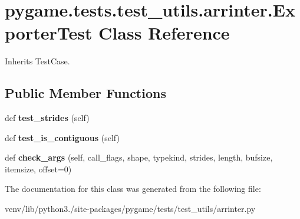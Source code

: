\hypertarget{classpygame_1_1tests_1_1test__utils_1_1arrinter_1_1_exporter_test}{}\section{pygame.\+tests.\+test\+\_\+utils.\+arrinter.\+Exporter\+Test Class Reference}
\label{classpygame_1_1tests_1_1test__utils_1_1arrinter_1_1_exporter_test}


Inherits Test\+Case.

\subsection*{Public Member Functions}
\begin{DoxyCompactItemize}
\item 
\mbox{\label{classpygame_1_1tests_1_1test__utils_1_1arrinter_1_1_exporter_test_a2ac60a9afe2a81929ff4c0376035f730}} 
def {\bfseries test\+\_\+strides} (self)
\item 
\mbox{\label{classpygame_1_1tests_1_1test__utils_1_1arrinter_1_1_exporter_test_a07610b722f4b1f42b73643cffdf4d019}} 
def {\bfseries test\+\_\+is\+\_\+contiguous} (self)
\item 
\mbox{\label{classpygame_1_1tests_1_1test__utils_1_1arrinter_1_1_exporter_test_a20c9a667a67609e3eb6fbe0f77c82ddd}} 
def {\bfseries check\+\_\+args} (self, call\+\_\+flags, shape, typekind, strides, length, bufsize, itemsize, offset=0)
\end{DoxyCompactItemize}


The documentation for this class was generated from the following file\+:\begin{DoxyCompactItemize}
\item 
venv/lib/python3./site-\/packages/pygame/tests/test\+\_\+utils/arrinter.\+py\end{DoxyCompactItemize}
